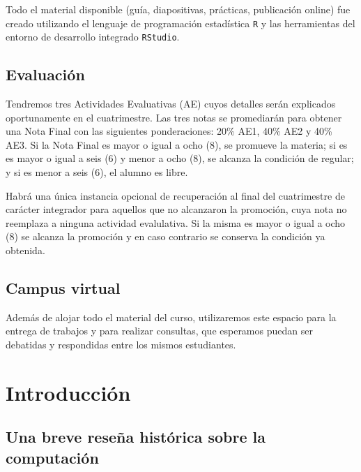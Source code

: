 \documentclass[]{book}
\begin{document}
Todo el material disponible (guía, diapositivas, prácticas, publicación online) fue creado utilizando el lenguaje de programación estadística \texttt{R} y las herramientas del entorno de desarrollo integrado \texttt{RStudio}.

\hypertarget{evaluacion}{%
\section*{Evaluación}\label{evaluacion}}

Tendremos tres Actividades Evaluativas (AE) cuyos detalles serán explicados oportunamente en el cuatrimestre. Las tres notas se promediarán para obtener una Nota Final con las siguientes ponderaciones: 20\% AE1, 40\% AE2 y 40\% AE3. Si la Nota Final es mayor o igual a ocho (8), se promueve la materia; si es es mayor o igual a seis (6) y menor a ocho (8), se alcanza la condición de regular; y si es menor a seis (6), el alumno es libre.

Habrá una única instancia opcional de recuperación al final del cuatrimestre de carácter integrador para aquellos que no alcanzaron la promoción, cuya nota no reemplaza a ninguna actividad evalulativa. Si la misma es mayor o igual a ocho (8) se alcanza la promoción y en caso contrario se conserva la condición ya obtenida.

\hypertarget{campus-virtual}{%
\section*{Campus virtual}\label{campus-virtual}}

Además de alojar todo el material del curso, utilizaremos este espacio para la entrega de trabajos y para realizar consultas, que esperamos puedan ser debatidas y respondidas entre los mismos estudiantes.

\hypertarget{introduccion}{%
\chapter{Introducción}\label{introduccion}}

\hypertarget{una-breve-resena-historica-sobre-la-computacion}{%
\section{Una breve reseña histórica sobre la computación}\label{una-breve-resena-historica-sobre-la-computacion}}
\end{document}
